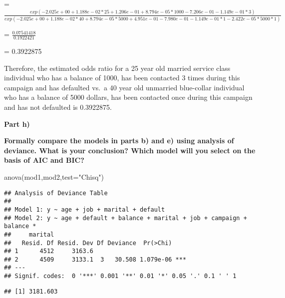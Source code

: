 \documentclass[
]{article}
\newenvironment{Shaded}{\begin{snugshade}}{\end{snugshade}}
\newcommand{\AttributeTok}[1]{\textcolor[rgb]{0.77,0.63,0.00}{#1}}
\newcommand{\FunctionTok}[1]{\textcolor[rgb]{0.00,0.00,0.00}{#1}}
\newcommand{\NormalTok}[1]{#1}
\newcommand{\SpecialCharTok}[1]{\textcolor[rgb]{0.00,0.00,0.00}{#1}}
\newcommand{\StringTok}[1]{\textcolor[rgb]{0.31,0.60,0.02}{#1}}
\begin{document}
=
\(\frac{exp(-2.025e+00+1.188e-02*25+1.206e-01+8.794e-05*1000-7.206e-01-1.149e-01*3)}{exp(-2.025e+00+1.188e-02*40+8.794e-05*5000+4.951e-01-7.980e-01-1.149e-01*1-2.422e-05*5000*1)}\)

= \(\frac{0.07541418}{0.1922421}\)

= 0.3922875

Therefore, the estimated odds ratio for a 25 year old married service
class individual who has a balance of 1000, has been contacted 3 times
during this campaign and has defaulted vs.~a 40 year old unmarried
blue-collar individual who has a balance of 5000 dollars, has been
contacted once during this campaign and has not defaulted is 0.3922875.

\textbf{Part h)}

\textbf{Formally compare the models in parts b) and e) using analysis of
deviance. What is your conclusion? Which model will you select on the
basis of AIC and BIC?}

\begin{Shaded}
\begin{Highlighting}[]
\FunctionTok{anova}\NormalTok{(mod1,mod2,}\AttributeTok{test=}\StringTok{"Chisq"}\NormalTok{)}
\end{Highlighting}
\end{Shaded}

\begin{verbatim}
## Analysis of Deviance Table
## 
## Model 1: y ~ age + job + marital + default
## Model 2: y ~ age + default + balance + marital + job + campaign + balance * 
##     marital
##   Resid. Df Resid. Dev Df Deviance  Pr(>Chi)    
## 1      4512     3163.6                          
## 2      4509     3133.1  3   30.508 1.079e-06 ***
## ---
## Signif. codes:  0 '***' 0.001 '**' 0.01 '*' 0.05 '.' 0.1 ' ' 1
\end{verbatim}

\begin{Shaded}
\end{Shaded}

\begin{verbatim}
## [1] 3181.603
\end{verbatim}

\begin{Shaded}
\end{Shaded}
\end{document}
